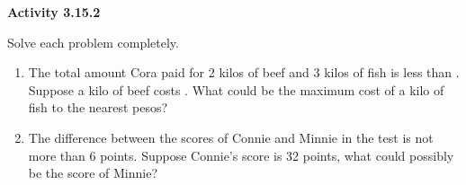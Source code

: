  \vspace{1ex}
\noindent\textbf{Activity 3.15.2}

\vspace{0.75ex}

Solve each problem completely.

\begin{enumerate}%
   \item The total amount Cora paid for 2 kilos of beef and 3 kilos of fish is less than . Suppose a kilo of beef costs . What could be the maximum cost of a kilo of fish to the nearest pesos?

   \item The difference between the scores of Connie and Minnie in the test is not more than 6 points. Suppose Connie's score is 32 points, what could possibly be the	score of Minnie?

\end{enumerate}
